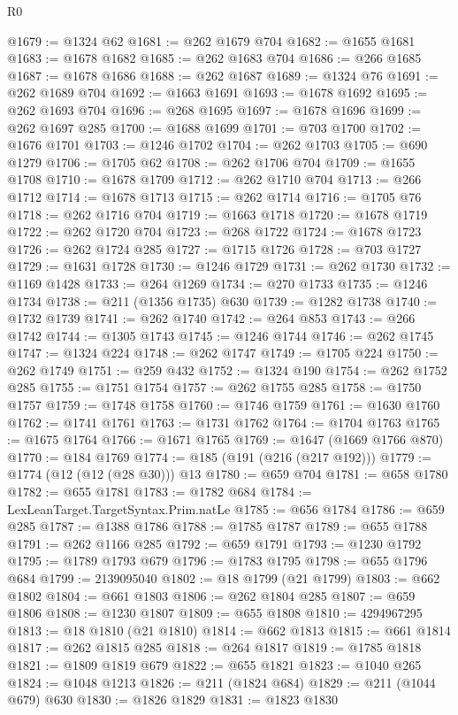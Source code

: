 \begin{lexlean}{R0}
\begin{coremodule}
@1679 := @1324 @62
@1681 := @262 @1679 @704
@1682 := @1655 @1681
@1683 := @1678 @1682
@1685 := @262 @1683 @704
@1686 := @266 @1685
@1687 := @1678 @1686
@1688 := @262 @1687
@1689 := @1324 @76
@1691 := @262 @1689 @704
@1692 := @1663 @1691
@1693 := @1678 @1692
@1695 := @262 @1693 @704
@1696 := @268 @1695
@1697 := @1678 @1696
@1699 := @262 @1697 @285
@1700 := @1688 @1699
@1701 := @703 @1700
@1702 := @1676 @1701
@1703 := @1246 @1702
@1704 := @262 @1703
@1705 := @690 @1279
@1706 := @1705 @62
@1708 := @262 @1706 @704
@1709 := @1655 @1708
@1710 := @1678 @1709
@1712 := @262 @1710 @704
@1713 := @266 @1712
@1714 := @1678 @1713
@1715 := @262 @1714
@1716 := @1705 @76
@1718 := @262 @1716 @704
@1719 := @1663 @1718
@1720 := @1678 @1719
@1722 := @262 @1720 @704
@1723 := @268 @1722
@1724 := @1678 @1723
@1726 := @262 @1724 @285
@1727 := @1715 @1726
@1728 := @703 @1727
@1729 := @1631 @1728
@1730 := @1246 @1729
@1731 := @262 @1730
@1732 := @1169 @1428
@1733 := @264 @1269
@1734 := @270 @1733
@1735 := @1246 @1734
@1738 := @211 (@1356 @1735) @630
@1739 := @1282 @1738
@1740 := @1732 @1739
@1741 := @262 @1740
@1742 := @264 @853
@1743 := @266 @1742
@1744 := @1305 @1743
@1745 := @1246 @1744
@1746 := @262 @1745
@1747 := @1324 @224
@1748 := @262 @1747
@1749 := @1705 @224
@1750 := @262 @1749
@1751 := @259 @432
@1752 := @1324 @190
@1754 := @262 @1752 @285
@1755 := @1751 @1754
@1757 := @262 @1755 @285
@1758 := @1750 @1757
@1759 := @1748 @1758
@1760 := @1746 @1759
@1761 := @1630 @1760
@1762 := @1741 @1761
@1763 := @1731 @1762
@1764 := @1704 @1763
@1765 := @1675 @1764
@1766 := @1671 @1765
@1769 := @1647 (@1669 @1766 @870)
@1770 := @184 @1769
@1774 := @185 (@191 (@216 (@217 @192)))
@1779 := @1774 (@12 (@12 (@28 @30))) @13
@1780 := @659 @704
@1781 := @658 @1780
@1782 := @655 @1781
@1783 := @1782 @684
@1784 := LexLeanTarget.TargetSyntax.Prim.natLe
@1785 := @656 @1784
@1786 := @659 @285
@1787 := @1388 @1786
@1788 := @1785 @1787
@1789 := @655 @1788
@1791 := @262 @1166 @285
@1792 := @659 @1791
@1793 := @1230 @1792
@1795 := @1789 @1793 @679
@1796 := @1783 @1795
@1798 := @655 @1796 @684
@1799 := 2139095040
@1802 := @18 @1799 (@21 @1799)
@1803 := @662 @1802
@1804 := @661 @1803
@1806 := @262 @1804 @285
@1807 := @659 @1806
@1808 := @1230 @1807
@1809 := @655 @1808
@1810 := 4294967295
@1813 := @18 @1810 (@21 @1810)
@1814 := @662 @1813
@1815 := @661 @1814
@1817 := @262 @1815 @285
@1818 := @264 @1817
@1819 := @1785 @1818
@1821 := @1809 @1819 @679
@1822 := @655 @1821
@1823 := @1040 @265
@1824 := @1048 @1213
@1826 := @211 (@1824 @684)
@1829 := @211 (@1044 @679) @630
@1830 := @1826 @1829
@1831 := @1823 @1830

\end{coremodule}
\end{lexlean}
